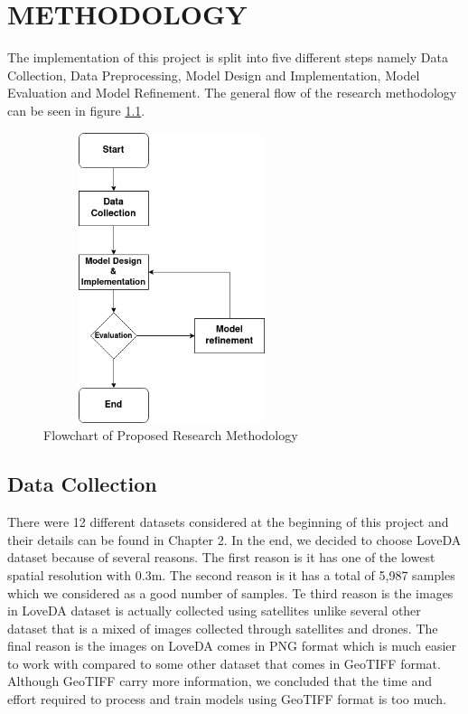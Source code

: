 \chapter{METHODOLOGY}

The implementation of this project is split into five different steps namely Data Collection, Data Preprocessing, Model Design and Implementation, Model Evaluation and Model Refinement. The general flow of the research methodology can be seen in figure \ref{fig:flowchart1}.

\FloatBarrier
\begin{figure}[!h]
\includegraphics[width=7.5cm, height=8.5cm]{images/flowchart1.png}
\centering
\caption{Flowchart of Proposed Research Methodology}
\label{fig:flowchart1}
\end{figure}


\section{Data Collection}

There were 12 different datasets considered at the beginning of this project and their details can be found in Chapter 2. In the end, we decided to choose LoveDA dataset \cite{loveda} because of several reasons. The first reason is it has one of the lowest spatial resolution with 0.3m. The second reason is it has a total of 5,987 samples which we considered as a good number of samples. Te third reason is the images in LoveDA dataset is actually collected using satellites unlike several other dataset that is a mixed of images collected through satellites and drones. The final reason is the images on LoveDA comes in PNG format which is much easier to work with compared to some other dataset that comes in GeoTIFF format. Although GeoTIFF carry more information, we concluded that the time and effort required to process and train models using GeoTIFF format is too much.

